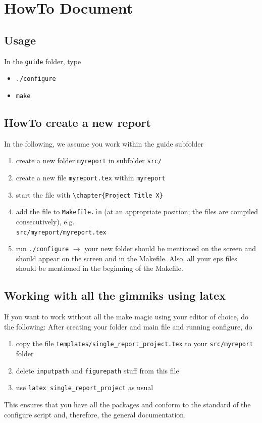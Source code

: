 \chapter{HowTo Document \ccarat{}} 

\newcommand{\test}[1]{\vec{#1}}

\section{Usage}

In the \verb|guide| folder, type
\begin{itemize}
\item \verb|./configure|
\item \verb|make|
\end{itemize}


\section{HowTo create a new report}
In the following, we assume you work within the guide subfolder
\begin{enumerate}
  \item create a new folder \verb|myreport| in subfolder \verb|src/|
  \item create a new file \verb|myreport.tex| within \verb|myreport|
  \item start the file with \verb|\chapter{Project Title X}|
  \item add the file to \texttt{Makefile.in} (at an appropriate position; the files are compiled consecutively), e.g.\\
  \verb|src/myreport/myreport.tex|
  \item run \verb|./configure| $\to$ your new folder should be mentioned on the screen and should appear on the screen and in the Makefile. Also, all your eps files should be mentioned in the beginning of the Makefile.
\end{enumerate}


\section{Working with all the gimmiks using latex}
If you want to work without all the make magic using your editor of choice, do the following:
After creating your folder and main file and running configure, do
\begin{enumerate}
 \item copy the file \verb|templates/single_report_project.tex| to your \verb|src/myreport| folder
 \item delete \verb|inputpath| and \verb|figurepath| stuff from this file
 \item use \verb|latex single_report_project| as usual
\end{enumerate}
This ensures that you have all the packages and conform to the standard of the configure script and, therefore, the general \ccarat{} documentation.



